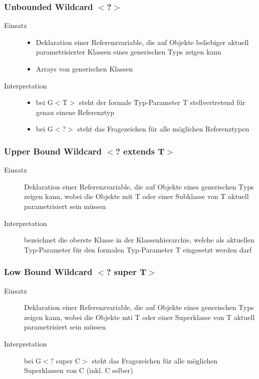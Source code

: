 \documentclass[a4paper,10pt]{article}
\begin{document}
\subsubsection{Unbounded Wildcard $<$?$>$}
\begin{description}
\item[Einsatz]
	\begin{itemize}
	\item Deklaration einer Referenzvariable, die auf Objekte beliebiger aktuell parametrisierter Klassen eines generischen Typs zeigen kann
	\item Arrays von generischen Klassen
	\end{itemize}
\item[Interpretation]
	\begin{itemize}
	\item bei G$<$T$>$ steht der formale Typ-Parameter T stellvertretend f\"ur genau einene Referenztyp
	\item bei G$<$?$>$ steht das Fragezeichen f\"ur alle m\"oglichen Referenztypen
	\end{itemize}
\end{description}


\subsubsection{Upper Bound Wildcard $<$? extends T$>$}
\begin{description}
\item[Einsatz] Deklaration einer Referenzvariable, die auf Objekte eines generischen Typs zeigen kann, wobei die Objekte mit T oder einer Subklasse von T aktuell parametrisiert sein m\"ussen
\item[Interpretation] bezeichnet die oberste Klasse in der Klassenhierarchie, welche als aktuellen Typ-Parameter f\"ur den formalen Typ-Parameter T eingesetzt werden darf
\end{description}


\subsubsection{Low Bound Wildcard $<$? super T$>$}
\begin{description}
\item[Einsatz] Deklaration einer Referenzvariable, die auf Objekte eines generischen Typs zeigen kann, wobei die Objekte mti T oder einer Superklasse von T aktuell parametrisiert sein m\"ussen
\item[Interpretation] bei G$<$? super C$>$ steht das Fragezeichen f\"ur alle m\"oglichen Superklassen von C (inkl. C selber)
\end{description}

\end{document}
